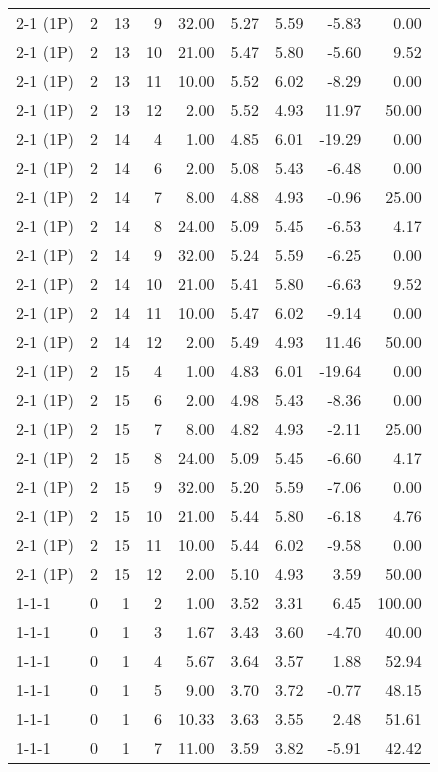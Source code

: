 \begin{tabular}{lrrrrrrrr}
2-1 (1P) & 2 & 13 & 9 & 32.00 & 5.27 & 5.59 & -5.83 & 0.00 \\
2-1 (1P) & 2 & 13 & 10 & 21.00 & 5.47 & 5.80 & -5.60 & 9.52 \\
2-1 (1P) & 2 & 13 & 11 & 10.00 & 5.52 & 6.02 & -8.29 & 0.00 \\
2-1 (1P) & 2 & 13 & 12 & 2.00 & 5.52 & 4.93 & 11.97 & 50.00 \\
2-1 (1P) & 2 & 14 & 4 & 1.00 & 4.85 & 6.01 & -19.29 & 0.00 \\
2-1 (1P) & 2 & 14 & 6 & 2.00 & 5.08 & 5.43 & -6.48 & 0.00 \\
2-1 (1P) & 2 & 14 & 7 & 8.00 & 4.88 & 4.93 & -0.96 & 25.00 \\
2-1 (1P) & 2 & 14 & 8 & 24.00 & 5.09 & 5.45 & -6.53 & 4.17 \\
2-1 (1P) & 2 & 14 & 9 & 32.00 & 5.24 & 5.59 & -6.25 & 0.00 \\
2-1 (1P) & 2 & 14 & 10 & 21.00 & 5.41 & 5.80 & -6.63 & 9.52 \\
2-1 (1P) & 2 & 14 & 11 & 10.00 & 5.47 & 6.02 & -9.14 & 0.00 \\
2-1 (1P) & 2 & 14 & 12 & 2.00 & 5.49 & 4.93 & 11.46 & 50.00 \\
2-1 (1P) & 2 & 15 & 4 & 1.00 & 4.83 & 6.01 & -19.64 & 0.00 \\
2-1 (1P) & 2 & 15 & 6 & 2.00 & 4.98 & 5.43 & -8.36 & 0.00 \\
2-1 (1P) & 2 & 15 & 7 & 8.00 & 4.82 & 4.93 & -2.11 & 25.00 \\
2-1 (1P) & 2 & 15 & 8 & 24.00 & 5.09 & 5.45 & -6.60 & 4.17 \\
2-1 (1P) & 2 & 15 & 9 & 32.00 & 5.20 & 5.59 & -7.06 & 0.00 \\
2-1 (1P) & 2 & 15 & 10 & 21.00 & 5.44 & 5.80 & -6.18 & 4.76 \\
2-1 (1P) & 2 & 15 & 11 & 10.00 & 5.44 & 6.02 & -9.58 & 0.00 \\
2-1 (1P) & 2 & 15 & 12 & 2.00 & 5.10 & 4.93 & 3.59 & 50.00 \\
1-1-1 & 0 & 1 & 2 & 1.00 & 3.52 & 3.31 & 6.45 & 100.00 \\
1-1-1 & 0 & 1 & 3 & 1.67 & 3.43 & 3.60 & -4.70 & 40.00 \\
1-1-1 & 0 & 1 & 4 & 5.67 & 3.64 & 3.57 & 1.88 & 52.94 \\
1-1-1 & 0 & 1 & 5 & 9.00 & 3.70 & 3.72 & -0.77 & 48.15 \\
1-1-1 & 0 & 1 & 6 & 10.33 & 3.63 & 3.55 & 2.48 & 51.61 \\
1-1-1 & 0 & 1 & 7 & 11.00 & 3.59 & 3.82 & -5.91 & 42.42 \\

\end{tabular}
